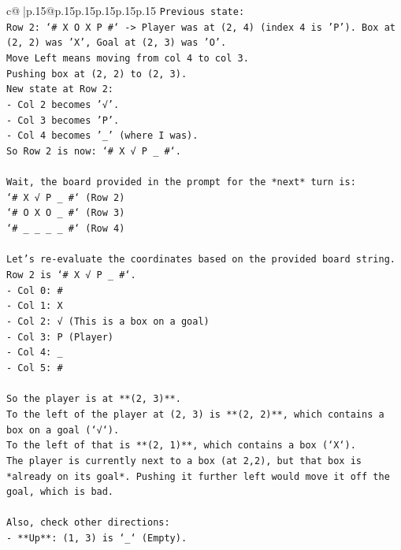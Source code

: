 \documentclass{article}
\begin{document}
{\begin{supertabular}{c@{$\;$}|p{.15\linewidth}@{}p{.15\linewidth}p{.15\linewidth}p{.15\linewidth}p{.15\linewidth}p{.15\linewidth}}
{{{\texttt{Previous state:} \\
\texttt{Row 2: `\# X O X P \#` {-}> Player was at (2, 4) (index 4 is 'P'). Box at (2, 2) was 'X', Goal at (2, 3) was 'O'.} \\
\texttt{Move Left means moving from col 4 to col 3.} \\
\texttt{Pushing box at (2, 2) to (2, 3).} \\
\texttt{New state at Row 2:} \\
\texttt{{-} Col 2 becomes '√'.} \\
\texttt{{-} Col 3 becomes 'P'.} \\
\texttt{{-} Col 4 becomes '\_' (where I was).} \\
\texttt{So Row 2 is now: `\# X √ P \_ \#`.} \\
\\ 
\texttt{Wait, the board provided in the prompt for the *next* turn is:} \\
\texttt{`\# X √ P \_ \#` (Row 2)} \\
\texttt{`\# O X O \_ \#` (Row 3)} \\
\texttt{`\# \_ \_ \_ \_ \#` (Row 4)} \\
\\ 
\texttt{Let's re{-}evaluate the coordinates based on the provided board string.} \\
\texttt{Row 2 is `\# X √ P \_ \#`.} \\
\texttt{{-} Col 0: \#} \\
\texttt{{-} Col 1: X} \\
\texttt{{-} Col 2: √ (This is a box on a goal)} \\
\texttt{{-} Col 3: P (Player)} \\
\texttt{{-} Col 4: \_} \\
\texttt{{-} Col 5: \#} \\
\\ 
\texttt{So the player is at **(2, 3)**.} \\
\texttt{To the left of the player at (2, 3) is **(2, 2)**, which contains a box on a goal (`√`).} \\
\texttt{To the left of that is **(2, 1)**, which contains a box (`X`).} \\
\texttt{The player is currently next to a box (at 2,2), but that box is *already on its goal*. Pushing it further left would move it off the goal, which is bad.} \\
\\ 
\texttt{Also, check other directions:} \\
\texttt{{-} **Up**: (1, 3) is `\_` (Empty).} \\
}}}
\end{supertabular}}
\end{document}
